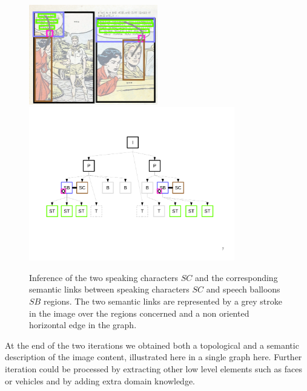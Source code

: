  \begin{figure}[!ht]  %
   \centering
   \includegraphics[trim= 0px 0px 0px 0px, clip, width=0.5\textwidth]{process_illustration_infer_2.png}\\
  \includegraphics[trim= 0px 128px 20px 85px, clip, width=0.8\textwidth]{graph_infer_2.pdf}
  \caption[Inference of the speaking characters $SC$ and the corresponding semantic links between speaking characters $SC$ and speech balloons $SB$ regions]{Inference of the two speaking characters $SC$ and the corresponding semantic links between speaking characters $SC$ and speech balloons $SB$ regions.
  The two semantic links are represented by a grey stroke in the image over the regions concerned and a non oriented horizontal edge in the graph.
  }
  \label{fig:kn:final_information}
 \end{figure}

At the end of the two iterations we obtained both a topological and a semantic description of the image content, illustrated here in a single graph here.
Further iteration could be processed by extracting other low level elements such as faces or vehicles and by adding extra domain knowledge.


